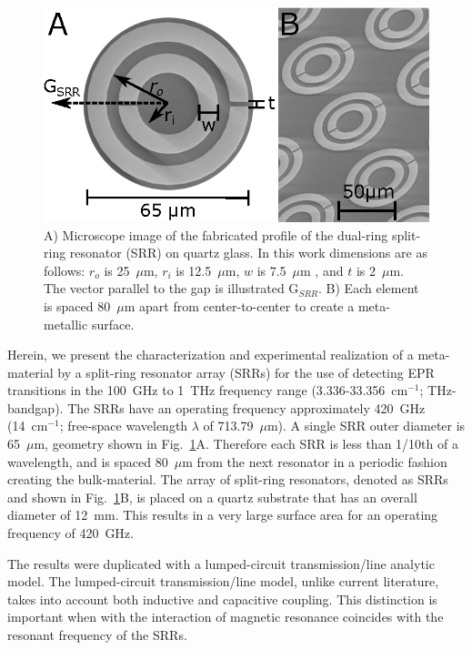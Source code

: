 \begin{figure}[htpb]
\centering
  \includegraphics{Kapitel/Ch3-Images/01-Measurements.eps}%
  \caption[Microscope image of the SRR geometry.]{ A) Microscope image of the fabricated profile of the dual-ring split-ring resonator (SRR) on quartz glass. In this work dimensions are as follows: $r_o$ is 25~$\mu$m, $r_i$ is 12.5~$\mu$m, $w$ is 7.5~$\mu$m , and $t$ is 2~$\mu$m. The vector parallel to the gap is illustrated G$_{SRR}$. B) Each element is spaced 80~$\mu$m apart from center-to-center to create a meta-metallic surface.}
  \label{ch3-fig:sizes}
\end{figure}

Herein, we present the characterization and experimental realization of a meta-material by a split-ring resonator array (SRRs) for the use of detecting EPR transitions in the 100~GHz to 1~THz frequency range (3.336-33.356~cm$^{-1}$; THz-bandgap). The SRRs have an operating frequency approximately 420~GHz (14~cm$^{-1}$; free-space wavelength $\lambda$ of 713.79~$\mu$m). A single SRR outer diameter is 65~$\mu$m, geometry shown in Fig.~\ref{ch3-fig:sizes}A. Therefore each SRR is less than 1/10th of a wavelength, and is spaced 80~$\mu$m from the next resonator in a periodic fashion creating the bulk-material. The array of split-ring resonators, denoted as SRRs and shown in Fig.~\ref{ch3-fig:sizes}B, is placed on a quartz substrate that has an overall diameter of 12~mm. This results in a very large surface area for an operating frequency of 420~GHz.

The results were duplicated with a lumped-circuit transmission\-/line analytic model. The lumped-circuit transmission\-/line model, unlike current literature, takes into account both inductive and capacitive coupling. This distinction is important when with the interaction of magnetic resonance coincides with the resonant frequency of the SRRs.


